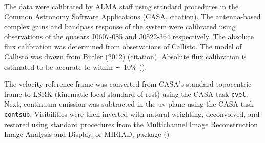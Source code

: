 The data were calibrated by ALMA staff using standard procedures in the Common Astronomy Software Applications (CASA, citation). The antenna-based complex gains and bandpass response of the system were calibrated using observations of the quasars J0607-085 and J0522-364 respectively. The absolute flux calibration was determined from observations of Callisto. The model of Callisto was drawn from Butler (2012) (citation). Absolute flux calibration is estimated to be accurate to within ∼ 10\% (\citet{mann_alma_2014}).

The velocity reference frame was converted from CASA's standard topocentric frame to LSRK (kinematic local standard of rest) using the CASA task \texttt{cvel}. Next, continuum emission was subtracted in the uv plane using the CASA task \texttt{contsub}. Visibilities were then inverted with natural weighting, deconvolved, and restored using standard procedures from the Multichannel Image Reconstruction Image Analysis and Display, or MIRIAD, package (\citet{rj_sault_astronomical_1995})








\iffalse
Things to get:
* Does ICR use natural weighting? (using robust=2)
\fi
